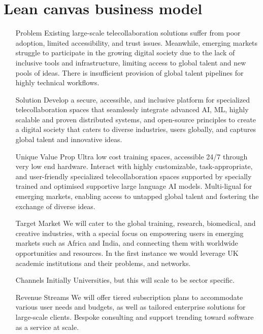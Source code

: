 \section{Lean canvas business model}
\begin{itemize}
\item [Problem] Existing large-scale telecollaboration solutions suffer from poor adoption, limited accessibility, and trust issues. Meanwhile, emerging markets struggle to participate in the growing digital society due to the lack of inclusive tools and infrastructure, limiting access to global talent and new pools of ideas. There is insufficient provision of global talent pipelines for highly technical workflows.
\item [Solution] Develop a secure, accessible, and inclusive platform for specialized telecollaboration spaces that seamlessly integrate advanced AI, ML, highly scalable and proven distributed systems, and open-source principles to create a digital society that caters to diverse industries, users globally, and captures global talent and innovative ideas.
\item [Unique Value Prop] Ultra low cost training spaces, accessible 24/7 through very low end hardware. Interact with highly customizable, task-appropriate, and user-friendly specialized telecollaboration spaces supported by specially trained and optimised supportive large language AI models. Multi-ligual for emerging markets, enabling access to untapped global talent and fostering the exchange of diverse ideas.
\item [Target Market] We will cater to the global training, research, biomedical, and creative industries, with a special focus on empowering users in emerging markets such as Africa and India, and connecting them with worldwide opportunities and resources. In the first instance we would leverage UK academic institutions and their problems, and networks.
\item [Channels] Initially Universities, but this will scale to be sector specific. %
\item [Revenue Streams] We will offer tiered subscription plans to accommodate various user needs and budgets, as well as tailored enterprise solutions for large-scale clients. Bespoke consulting and support trending toward software as a service at scale. %

\end{itemize}
